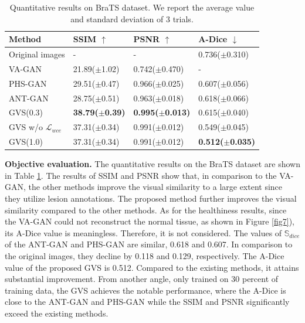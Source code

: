 \documentclass[journal,twoside,web]{ieeecolor}
\begin{document}
\begin{table}
	\centering
	\caption{Quantitative results on BraTS dataset. We report the average value and standard deviation of 3 trials.}	
	\begin{tabular}{llll}
		\toprule
		Method & SSIM $\uparrow$ & PSNR $\uparrow$ & A-Dice $\downarrow$ \\
		\midrule
		Original images & - & - & 0.736($\pm$0.310) \\
		VA-GAN \cite{baumgartner2018visual}  & 21.89($\pm$1.02) & 0.742($\pm$0.470) & - \\
		PHS-GAN \cite{xia2020pseudo} & 29.51($\pm$0.47) & 0.966($\pm$0.025) & 0.607($\pm$0.056) \\
		ANT-GAN \cite{sun2020adversarial} & 28.75($\pm$0.51) & 0.963($\pm$0.018) & 0.618($\pm$0.066) \\
		GVS(0.3) & \textbf{38.79($\pm$0.39)} & \textbf{0.995($\pm$0.013)} & 0.615($\pm$0.040) \\
		GVS w/o $\mathcal{L}_{wce}$ &  37.31($\pm$0.34) & 0.991($\pm$0.012) & 0.549($\pm$0.045) \\
		\rowcolor{gray!20} GVS(1.0) & 37.31($\pm$0.34) & 0.991($\pm$0.012) & \textbf{0.512($\pm$0.035)} \\
		\bottomrule
	\end{tabular}
	\label{tab1}
\end{table}


\noindent\textbf{Objective evaluation.} The quantitative results on the BraTS dataset are shown in Table \ref{tab1}. The results of SSIM and PSNR show that, in comparison to the VA-GAN, the other methods improve the visual similarity to a large extent since they utilize lesion annotations. The proposed method further improves the visual similarity compared to the other methods. As for the healthiness results, since the VA-GAN could not reconstruct the normal tissue, as shown in Figure \ref{fig7}), its A-Dice value is meaningless. Therefore, it is not considered. The values of $\mathbb{S}_{dice}$ of the ANT-GAN and PHS-GAN are similar, 0.618 and 0.607. In comparison to the original images, they decline by 0.118 and 0.129, respectively. The A-Dice value of the proposed GVS is 0.512. Compared to the existing methods, it attains substantial improvement. From another angle, only trained on 30 percent of training data, the GVS achieves the notable performance, where the A-Dice is close to the ANT-GAN and PHS-GAN while the SSIM and PSNR significantly exceed the existing methods. 
\end{document}
